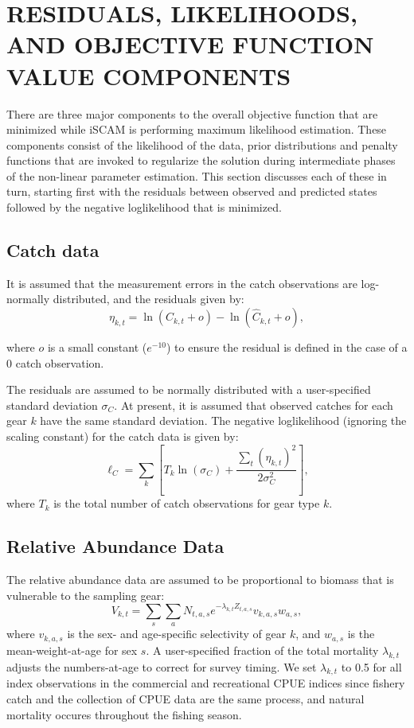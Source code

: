 \section{RESIDUALS, LIKELIHOODS, AND OBJECTIVE FUNCTION VALUE COMPONENTS}

There are three major components to the overall objective function that are minimized while iSCAM is performing maximum likelihood estimation. These components consist of the likelihood of the data, prior distributions and penalty functions that are invoked to regularize the solution during intermediate phases of the non-linear parameter estimation. This section discusses each of these in turn, starting first with the residuals between observed and predicted states followed by the negative loglikelihood that is minimized.

\subsection{Catch data}

It is assumed that the measurement errors in the catch observations are log-normally distributed, and the residuals given by:
\begin{equation}\label{eq:df27}
\eta_{k,t}=\ln(C_{k,t}+o) -  \ln(\hat{C}_{k,t}+o),
\end{equation}
\begin{addmargin}[3em]{1em}
where $o$ is a small constant ($e^{-10}$) to ensure the residual is defined in the case of a 0 catch observation.
\end{addmargin}
The residuals are assumed to be normally distributed with a user-specified standard deviation $\sigma_{C}$.  At present, it is assumed that observed catches for each gear $k$  have the same standard deviation. The negative loglikelihood (ignoring the scaling constant) for the catch data is given by:
\begin{equation}\label{eq:df28}
\ell_C = \sum_k\left[  T_k\ln(\sigma_C)+\frac{\sum_t(\eta_{k,t})^2}{2\sigma_C^2}\right],
\end{equation}
where $T_k$ is the total number of catch observations for gear type $k$.

\subsection{Relative Abundance Data}

The relative abundance data are assumed to be proportional to biomass that is vulnerable to the sampling gear:
\begin{equation}\label{eq:df29}
 V_{k,t} = \sum_s \sum_a N_{t,a,s} e^{-\lambda_{k,t} Z_{t,a,s}} v_{k,a,s} w_{a,s},
\end{equation}
where $v_{k,a,s}$ is the sex- and age-specific selectivity of gear $k$, and $w_{a,s}$ is the mean-weight-at-age for sex $s$.  A user-specified fraction of the total mortality $\lambda_{k,t}$ adjusts the numbers-at-age to correct for survey timing. We set $\lambda_{k,t}$ to 0.5 for all index observations in the commercial and recreational CPUE indices since fishery catch and the collection of CPUE data are the same process, and natural mortality occures throughout the fishing season. 

